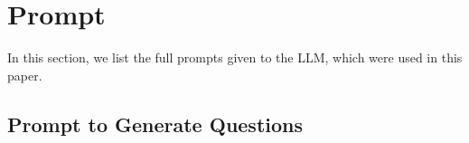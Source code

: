 \appendix



\section{Prompt}
In this section, we list the full prompts given to the LLM, which were used in this paper.
\subsection{Prompt to Generate Questions}
